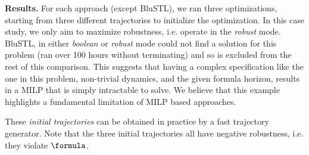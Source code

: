 
\textbf{Results.}
For each approach (except BluSTL), we ran three optimizations, starting from three different trajectories to initialize the optimization. In this case study, we only aim to maximize robustness, i.e. operate in the \textit{robust} mode. BluSTL, in either \textit{boolean} or \textit{robust} mode could not find a solution for this problem (ran over 100 hours without terminating) and so is excluded from the rest of this comparison. This suggests that having a complex specification like the one in this problem, non-trivial dynamics, and the given formula horizon, results in a MILP that is simply intractable to solve. We believe that this example highlights a fundamental limitation of MILP based approaches.

These \textit{initial trajectories} can be obtained in practice by a fast trajectory generator. Note that the three initial trajectories all have negative robustness, i.e. they violate $\formula$.


